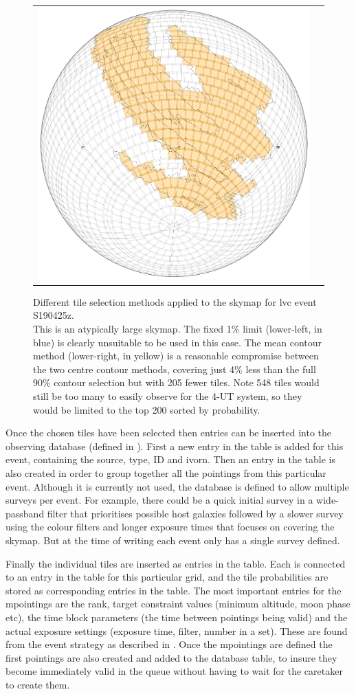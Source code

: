 \begin{colsection}
\begin{colsection}
\begin{figure}[p]
\begin{center}
\begin{tabular}{cc}
            \includegraphics[width=0.25\linewidth]{images/tiling/3_b.png} \\
        \end{tabular}
    \end{center}
    \caption[Different tile selection methods for S190425z]{
        Different tile selection methods applied to the skymap for \gls{lvc} event S190425z.\\
        This is an atypically large skymap. The fixed 1\% limit (lower-left, in blue) is clearly unsuitable to be used in this case. The mean contour method (lower-right, in yellow) is a reasonable compromise between the two centre contour methods, covering just 4\% less than the full 90\% contour selection but with 205 fewer tiles. Note 548 tiles would still be too many to easily observe for the 4-UT system, so they would be limited to the top 200 sorted by probability.
    }\label{fig:tiling_S190425z}
\end{figure}

\clearpage

Once the chosen tiles have been selected then entries can be inserted into the observing database (defined in ). First a new entry in the  table is added for this event, containing the source, type, ID and \gls{ivorn}. Then an entry in the  table is also created in order to group together all the pointings from this particular event. Although it is currently not used, the database is defined to allow multiple surveys per event. For example, there could be a quick initial survey in a wide-passband filter that prioritises possible host galaxies followed by a slower survey using the colour filters and longer exposure times that focuses on covering the skymap. But at the time of writing each event only has a single survey defined.

Finally the individual tiles are inserted as entries in the  table. Each is connected to an entry in the  table for this particular grid, and the tile probabilities are stored as corresponding entries in the  table. The most important entries for the mpointings are the rank, target constraint values (minimum altitude, moon phase etc), the time block parameters (the time between pointings being valid) and the actual exposure settings (exposure time, filter, number in a set). These are found from the event strategy as described in . Once the mpointings are defined the first pointings are also created and added to the database  table, to insure they become immediately valid in the queue without having to wait for the caretaker to create them.


\end{colsection}
\end{colsection}
